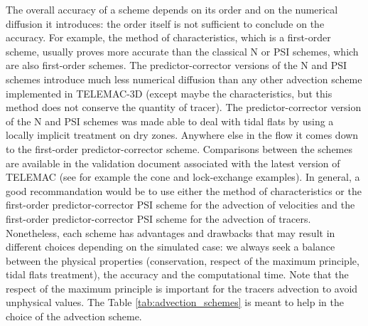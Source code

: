 The overall accuracy of a scheme depends on its order and on the numerical diffusion it introduces: the order itself is not sufficient to
conclude on the accuracy. For example, the method of characteristics, which is a first-order scheme, usually proves more accurate than the classical N or PSI schemes,
which are also first-order schemes. The predictor-corrector versions of the N and PSI schemes introduce much less numerical diffusion
than any other advection scheme implemented in TELEMAC-3D (except maybe the characteristics, but this method does not conserve the quantity of tracer).
The predictor-corrector version of the N and PSI schemes was made able to deal with tidal flats by using a locally implicit treatment on dry zones. Anywhere else
in the flow it comes down to the first-order predictor-corrector scheme.
Comparisons between the schemes are available in the validation document associated with the latest version of TELEMAC (see for example the cone and lock-exchange examples).
In general, a good recommandation would be to use either the method of characteristics or the first-order predictor-corrector PSI scheme for the
advection of velocities and the first-order predictor-corrector PSI scheme for the advection of tracers.
Nonetheless, each scheme has advantages and drawbacks that may result in different choices depending on the simulated case: we always seek a balance
between the physical properties (conservation, respect of the maximum principle, tidal flats treatment), the accuracy and the computational time.
Note that the respect of the maximum principle is important for the tracers advection to avoid unphysical values.
The Table \ref{tab:advection_schemes} is meant to help in the choice of the advection scheme.

